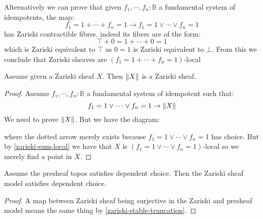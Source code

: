 \begin{remark}
Alternatively we can prove that given $f_1,\cdots,f_n:\mathbb{B}$ a fundamental system of idempotents, the map:
\[f_1=1+\cdots + f_n=1 \to f_1=1\lor\cdots\lor f_n=1\]
has Zariski contractible fibres, indeed its fibers are of the form:
\[\top + 0=1 + \cdots + 0=1\]
which is Zariski equivalent to $\top$ as $0=1$ is Zariski equivalent to $\bot$. From this we conclude that Zariski sheaves are $(f_1=1+\cdots + f_n=1)$-local
\end{remark}

\begin{lemma}\label{zariski-stable-truncation}
Assume given a Zariski sheaf $X$. Then $\lVert X \rVert$ is a Zariski sheaf.
\end{lemma}

\begin{proof}
Assume $f_1,\cdots,f_n:\mathbb{B}$ a fundamental system of idempotent such that:
\[f_1=1\lor\cdots\lor f_n=1 \to \lVert X \rVert\]
We need to prove $\lVert X \rVert$. But we have the diagram:
 \begin{center}
  \end{center}
  where the dotted arrow merely exists because $f_1=1\lor\cdots\lor f_n=1$ has choice. But by \cref{zariski-sum-local} we have that $X$ is $(f_1=1\lor\cdots\lor f_n=1)$-local so we merely find a point in $X$.
\end{proof}

\begin{proposition}
Assume the presheaf topos satisfies dependent choice. Then the Zariski sheaf model satisfies dependent choice.
\end{proposition}

\begin{proof}
A map between Zariski sheaf being surjective in the Zariski and presheaf model means the same thing by \cref{zariski-stable-truncation}.
\end{proof}

